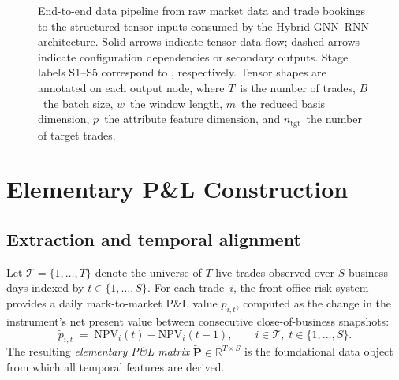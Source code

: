 \documentclass[11pt,a4paper]{article}
\newcommand{\R}{\mathbb{R}}
\newcommand{\calT}{\mathcal{T}}
\newcommand{\bP}{\bm{P}}
\begin{document}
\begin{figure}[t]
{%
  }%
  \caption{%
    End-to-end data pipeline from raw market data and trade bookings to the
    structured tensor inputs consumed by the Hybrid GNN--RNN architecture.
    Solid arrows indicate tensor data flow; dashed arrows indicate
    configuration dependencies or secondary outputs.  Stage labels
    S1--S5 correspond to
    ,
    respectively.  Tensor shapes are annotated on each output node, where
    $T$~is the number of trades, $B$~the batch size, $w$~the window length,
    $m$~the reduced basis dimension, $p$~the attribute feature dimension, and
    $n_{\mathrm{tgt}}$~the number of target trades.%
  }
  \label{fig:pipeline-overview}
\end{figure}


\section{Elementary P\&L Construction}\label{sec:pnl}

\subsection{Extraction and temporal alignment}\label{sec:pnl:extract}

Let $\calT = \{1,\dotsc,T\}$ denote the universe of $T$ live trades observed
over $S$ business days indexed by $t \in \{1,\dotsc,S\}$.  For each trade~$i$,
the front-office risk system provides a daily mark-to-market P\&L value
$\tilde{p}_{i,t}$, computed as the change in the instrument's net present
value between consecutive close-of-business snapshots:
%
\begin{equation}\label{eq:raw-pnl}
  \tilde{p}_{i,t}
  \;=\;
  \mathrm{NPV}_i(t) - \mathrm{NPV}_i(t-1),
  \qquad
  i \in \calT,\;
  t \in \{1,\dotsc,S\}.
\end{equation}
%
The resulting \emph{elementary P\&L matrix}
$\tilde{\bP} \in \R^{T \times S}$ is the foundational data object from which
all temporal features are derived.
\end{document}
